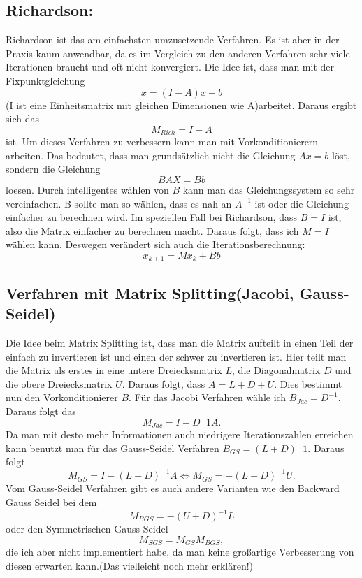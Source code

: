 \documentclass[a4paper, 11pt]{article}
\begin{document}
\subsection{Richardson:}
Richardson ist das am einfachsten umzusetzende Verfahren. Es ist aber in der Praxis kaum anwendbar, da es im Vergleich zu den anderen Verfahren sehr viele Iterationen braucht und oft nicht konvergiert.
Die Idee ist, dass man mit der Fixpunktgleichung 
\begin{equation}
x=(I-A)x+b
\end{equation}  (I ist eine Einheitsmatrix mit gleichen Dimensionen wie A)arbeitet. Daraus ergibt sich das 
\begin{equation}
M_{Rich}=I-A
\end{equation}
ist. Um dieses Verfahren zu verbessern kann man mit Vorkonditionierern arbeiten. Das bedeutet, dass man grunds\"atzlich nicht die Gleichung \(Ax=b\) l\"ost, sondern die Gleichung 
\begin{equation}
BAX=Bb
\end{equation}
loesen. Durch intelligentes w\"ahlen von \(B\) kann man das Gleichungssystem so sehr vereinfachen. B sollte man so w\"ahlen, dass es nah an \(A^{-1}\) ist oder die Gleichung einfacher zu berechnen wird. Im speziellen Fall bei Richardson, dass \(B=I\) ist,
also die Matrix einfacher zu berechnen macht. Daraus folgt, dass ich \(M=I\) w\"ahlen kann. Deswegen ver\"andert sich auch die Iterationsberechnung:
\begin{equation}
x_{k+1}=Mx_{k}+Bb
\end{equation}

\subsection{Verfahren mit Matrix Splitting(Jacobi, Gauss-Seidel)}
Die Idee beim Matrix Splitting ist, dass man die Matrix aufteilt in einen Teil der einfach zu invertieren ist und einen der schwer zu invertieren ist. Hier teilt man die Matrix als erstes in eine untere Dreiecksmatrix \(L\), 
die Diagonalmatrix \(D\) und die obere Dreiecksmatrix \(U\). Daraus folgt, dass \(A = L+D+U\). Dies bestimmt nun den Vorkonditionierer \(B\).
F\"ur das Jacobi Verfahren w\"ahle ich \(B_{Jac}=D^{-1}\). Daraus folgt das
\begin{equation}
M_{Jac}=I-D^-1A.
\end{equation}
Da man mit desto mehr Informationen auch niedrigere Iterationszahlen erreichen kann benutzt man f\"ur das Gauss-Seidel Verfahren \(B_{GS} = (L+D)^-1\). Daraus folgt 
\begin{equation}
M_{GS} = I-(L+D)^{-1}A \Leftrightarrow M_{GS} = -(L+D)^{-1}U.
\end{equation} Vom Gauss-Seidel Verfahren gibt es auch andere Varianten wie den Backward Gauss Seidel bei dem 
\begin{equation}
  M_{BGS} = -(U+D)^{-1 }L
\end{equation} oder den Symmetrischen Gauss Seidel 
\begin{equation}
M_{SGS}= M_{GS}M_{BGS},
\end{equation} die ich aber nicht implementiert habe, da man keine gro\ss{}artige Verbesserung von diesen erwarten kann.(Das vielleicht noch mehr erkl\"aren!)
\end{document}
